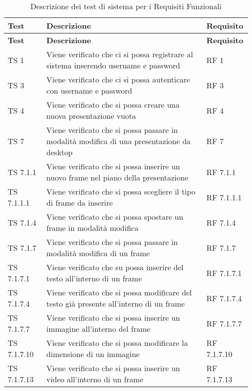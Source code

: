 {{	
		\renewcommand*{\arraystretch}{1.4}
		\begin{longtable} [c]{| p{3cm} | p{6cm} |p{3cm}|}
			\caption{Descrizione dei test di sistema per i Requisiti Funzionali
			 \label{tab:verReqFunz}}\\
			 \hline
			 \textbf{Test} & \textbf{Descrizione} & \textbf{Requisito} \\
			 \hline
			 \endfirsthead
			 \hline
			 \textbf{Test} & \textbf{Descrizione} & \textbf{Requisito} \\
			 \hline
			\endhead
			 \hline
			 \endfoot
			 \hline
			 \endlastfoot
			TS 1 & Viene verificato che ci si possa registrare al sistema inserendo username e password & RF 1\\
			\hline
			TS 3 & Viene verificato che ci si possa autenticare con username e password & RF 3\\
			\hline
			TS 4 & Viene verificato che si possa creare una nuova presentazione vuota & RF 4\\
			\hline
			TS 7 & Viene verificato che si possa passare in modalità modifica di una presentazione da desktop\ped{g} & RF 7\\
			\hline
			TS 7.1.1 & Viene verificato che si possa inserire un nuovo frame\ped{g} nel piano della presentazione\ped{g} & RF 7.1.1\\
			\hline
			TS 7.1.1.1 & Viene verificato che si possa scegliere il tipo di frame\ped{g} da inserire & RF 7.1.1.1\\
			\hline
			TS 7.1.4 & Viene verificato che si possa spostare un frame\ped{g} in modalità modifica & RF 7.1.4\\
			\hline
			TS 7.1.7 & Viene verificato che si possa passare in modalità modifica di un frame\ped{g} & RF 7.1.7\\
			\hline
			TS 7.1.7.1 & Viene verificato che su possa inserire del testo all'interno di un frame\ped{g} & RF 7.1.7.1\\
			\hline
			TS 7.1.7.4 & Viene verificato che si possa modificare del testo già presente all'interno di un frame\ped{g} & RF 7.1.7.4\\
			\hline
			TS 7.1.7.7 & Viene verificato che si possa inserire un immagine all'interno del frame\ped{g} & RF 7.1.7.7\\
			\hline
			TS 7.1.7.10 & Viene verificato che si possa modificare la dimensione di un immagine & RF 7.1.7.10\\
			\hline
			TS 7.1.7.13 & Viene verificato che si possa inserire un video all'interno di un frame\ped{g} & RF 7.1.7.13\\

\end{longtable}}}
